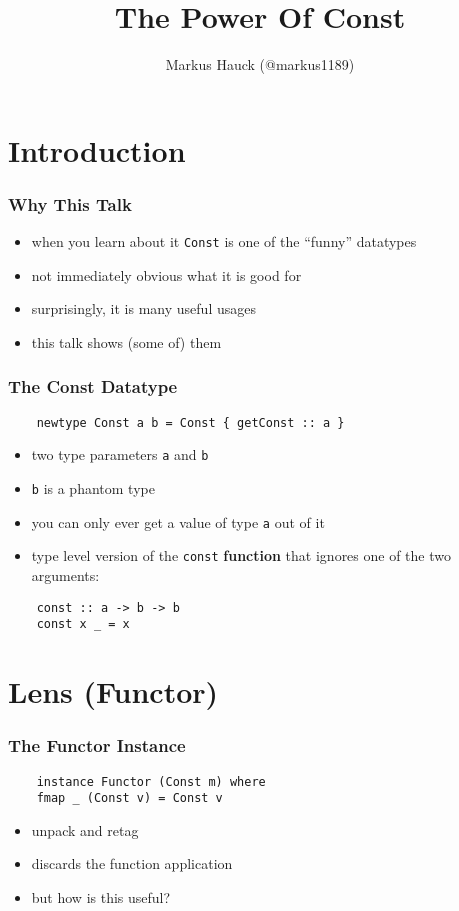 \documentclass[aspectratio=169]{beamer}
\title{The Power Of Const}
\author{Markus Hauck (@markus1189)}
\begin{document}
\begin{frame}
  \titlepage{}
\end{frame}

\section{Introduction}\label{sec:introduction}

\begin{frame}
  \frametitle{Why This Talk}
  \begin{itemize}
  \item when you learn about it \texttt{Const} is one of the ``funny'' datatypes
  \item not immediately obvious what it is good for
  \item surprisingly, it is many useful usages
  \item this talk shows (some of) them
  \end{itemize}
\end{frame}

\begin{frame}[fragile]
  \frametitle{The Const Datatype}
  \begin{verbatim}
    newtype Const a b = Const { getConst :: a }
  \end{verbatim}
  \vfill
  \begin{itemize}
  \item two type parameters \texttt{a} and \texttt{b}
  \item \texttt{b} is a phantom type
  \item you can only ever get a value of type \texttt{a} out of it
  \item type level version of the \texttt{const} \textbf{function} that ignores one of
    the two arguments:
  \end{itemize}
  \begin{verbatim}
    const :: a -> b -> b
    const x _ = x
  \end{verbatim}
\end{frame}

\section{Lens (Functor)}

\begin{frame}[fragile]
  \frametitle{The Functor Instance}
  \begin{verbatim}
    instance Functor (Const m) where
    fmap _ (Const v) = Const v
  \end{verbatim}
  \vfill
  \begin{itemize}
  \item unpack and retag
  \item discards the function application
  \item but how is this useful?
  \end{itemize}
\end{frame}
\end{document}
